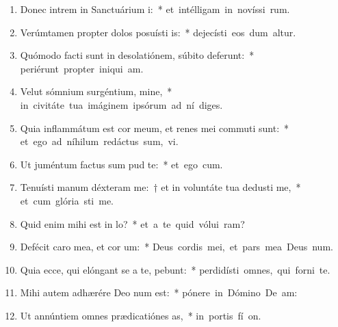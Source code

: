 \begin{flushleft}
\begin{enumerate}[leftmargin=*]
\item Donec intrem in Sanctuárium i:~* \mbox{et intélligam in novíssi rum.}
\item Verúmtamen propter dolos posuísti is:~* \mbox{dejecísti eos dum altur.}
\item Quómodo facti sunt in desolatiónem, súbito deferunt:~* \mbox{periérunt propter iniqui am.}
\item Velut sómnium surgéntium, mine,~* \mbox{in civitáte tua imáginem ipsórum ad ní diges.}
\item Quia inflammátum est cor meum, et renes mei commuti sunt:~* \mbox{et ego ad níhilum redáctus sum,  vi.}
\item Ut juméntum factus sum pud te:~* \mbox{et ego  cum.}
\item Tenuísti manum déxteram me:~† et in voluntáte tua dedusti me,~* \mbox{et cum glória sti me.}
\item Quid enim mihi est in lo?~* \mbox{et a te quid vólui  ram?}
\item Defécit caro mea, et cor um:~* \mbox{Deus cordis mei, et pars mea Deus  num.}
\item Quia ecce, qui elóngant se a te, pebunt:~* \mbox{perdidísti omnes, qui forni  te.}
\item Mihi autem adhærére Deo num est:~* \mbox{pónere in Dómino De  am:}
\item Ut annúntiem omnes prædicatiónes as,~* \mbox{in portis fí on.}

\end{enumerate}
\end{flushleft}

